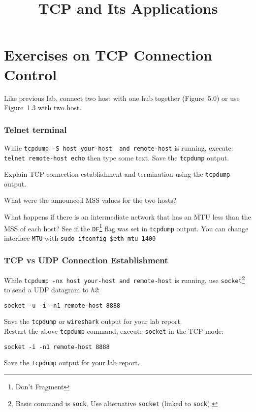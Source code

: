 \documentclass{../UTNetLab}
\title{TCP and Its Applications}
\begin{document}
\part{Exercises on TCP Connection Control}
    Like previous lab, connect two host with one hub together (Figure~5.0) or use Figure~1.3 with two host.

\section{Telnet terminal}
    While \lstinline[emph={your-host, remote-host}]{tcpdump -S host your-host  and remote-host} is running, execute: \lstinline[emph={your-host, remote-host}]{telnet remote-host echo} then type some text.
    Save the \lstinline{tcpdump} output.
    
    \begin{report}
    \item Explain TCP connection establishment and termination using the \lstinline{tcpdump} output.
    
    \item What were the announced MSS values for the two hosts?
    
    \item What happens if there is an intermediate network that has an MTU less than the MSS of each host?
    See if the \texttt{DF}\footnote{Don't Fragment} flag was set in \lstinline{tcpdump} output.
    You can change interface \texttt{MTU} with \lstinline[emph=$eth]{sudo ifconfig $eth mtu 1400}
    \end{report}
    
\section{TCP vs UDP Connection Establishment}
    While \lstinline[emph={your-host, remote-host}]{tcpdump -nx host your-host and remote-host} is running, use \lstinline{socket}\footnote{Basic command is \lstinline{sock}. Use alternative \lstinline{socket} (linked to \lstinline{sock}).} to send a UDP datagram to \textit{h2}:
    \begin{lstlisting}[emph={your-host, remote-host}]
socket -u -i -n1 remote-host 8888
    \end{lstlisting}
    {Save} the \lstinline{tcpdump} or \lstinline{wireshark} output for your lab report. \\
    Restart the above \lstinline{tcpdump} command, execute \lstinline{socket} in the TCP mode:
    \begin{lstlisting}[emph={remote-host}]
socket -i -n1 remote-host 8888
    \end{lstlisting}
    {Save} the \lstinline{tcpdump} output for your lab report.
    
\end{document}

